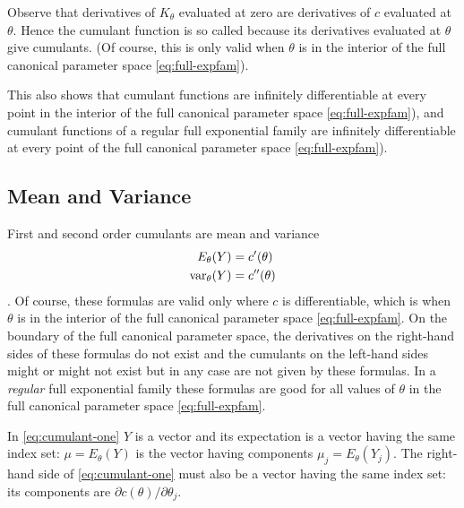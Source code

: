 Observe that derivatives of $K_\theta$ evaluated at zero are derivatives
of $c$ evaluated at $\theta$.  Hence the cumulant function is so called
because its derivatives evaluated at $\theta$ give cumulants.
(Of course, this is only valid when $\theta$ is in the interior of the
full canonical parameter space \eqref{eq:full-expfam}).

This also shows that cumulant functions are infinitely differentiable
at every point in the interior of the full canonical
parameter space \eqref{eq:full-expfam}), and
cumulant functions of a regular full exponential family
are infinitely differentiable
at every point of the full canonical
parameter space \eqref{eq:full-expfam}).

\subsection{Mean and Variance}
\label{sec:mean-variance-cumulant}

First and second order cumulants are mean and variance
\begin{subequations}
\begin{align}
   E_\theta(Y) & = c'(\theta)
   \label{eq:cumulant-one}
   \\
   \operatorname{var}_\theta(Y) & = c''(\theta)
   \label{eq:cumulant-two}
\end{align}
\end{subequations}
\citep[Theorem~8.1]{barndorff-nielsen}.
Of course, these formulas are valid only where $c$ is differentiable,
which is when $\theta$ is in the interior of the full canonical
parameter space \eqref{eq:full-expfam}.
On the boundary of the full canonical parameter space, the derivatives
on the right-hand sides of these formulas do not exist and the cumulants
on the left-hand sides might or might not exist but in any case are not
given by these formulas.
In a \emph{regular} full exponential family these formulas are good
for all values of $\theta$ in the full canonical
parameter space \eqref{eq:full-expfam}.

In \eqref{eq:cumulant-one} $Y$ is a vector and its expectation is a vector
having the same index set: $\mu = E_\theta(Y)$ is the vector having components
$\mu_j = E_\theta(Y_j)$.
The right-hand side of \eqref{eq:cumulant-one} must also be a vector having
the same index set: its components are $\partial c(\theta) / \partial \theta_j$.

